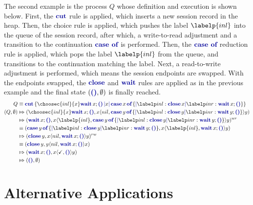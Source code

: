 The second example is the process $Q$ whose definition and execution is shown below. First, the $\cutp$ rule is applied, which inserts a new session record in the heap. Then, the choice rule is applied, which pushes the label $\labelp{inl}$ into the queue of the session record, after which, a write-to-read adjustment and a transition to the continuation $\casep$ is performed. Then, the $\casep$ reduction rule is applied, which pops the label $\labelp{inl}$ from the queue, and transitions to the continuation matching the label. Next, a read-to-write adjustment is performed, which means the session endpoints are swapped. With the endpoints swapped, the $\closep$ and $\waitp$ rules are applied as in the previous example and the final state $(\emptyc, \emptyset)$ is finally reached.
\[\begin{aligned}
    Q &\equiv
    \cutc{
        \choosec{inl}{x}
        \waitc{x}\emptyc
    }{x}{
        \casec{x}{
            \labelc{inl}{\closec{x}}
            \labelc{inr}{\waitc{x}\emptyc}
        }
    }\\
    (Q, \emptyset)
         & \Mapsto
        (\choosec{inl}{x}\waitc{x}\emptyc, x\langle nil, \casec{y}{\labelc{inl}{\closec{y}}\labelc{inr}{\waitc{y}\emptyc}}\rangle y)          \\
         & \Mapsto (\waitc{x}\emptyc, x\langle \labelp{inl}, \casec{y}{\labelc{inl}{\closec{y}}\labelc{inr}{\waitc{y}\emptyc}}\rangle y)^{wr} \\
         & \equiv (\casec{y}{\labelc{inl}{\closec{y}}\labelc{inr}{\waitc{y}\emptyc}}, x\langle \labelp{inl}, \waitc{x}\emptyc\rangle y)       \\
         & \Mapsto (\closec{y}, x\langle nil, \waitc{x}\emptyc\rangle y)^{rw}                                                                 \\
         & \equiv (\closec{y}, y\langle nil, \waitc{x}\emptyc\rangle x)                                                                       \\
         & \Mapsto (\waitc{x}\emptyc, x\langle \checkmark, \emptyp\rangle y)                                                                  \\
         & \Mapsto (\emptyc, \emptyset)
\end{aligned}\]

\section{Alternative Applications}

